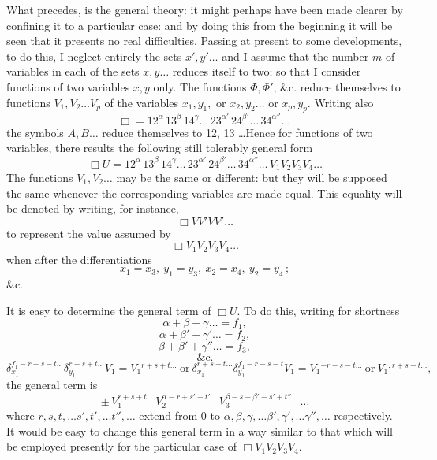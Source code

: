 \documentclass[11pt]{article}
\begin{document}
What precedes, is the general theory: it might perhaps have been made clearer
by confining it to a particular case: and by doing this from the beginning it will
be seen that it presents no real difficulties. Passing at present to some developments,
to do this, I neglect entirely the sets $x', y' \ldots$ and I assume that the number $m$ of
variables in each of the sets $x, y \ldots$ reduces itself to two; so that I consider functions
of two variables $x, y$ only. The functions $\Phi, \Phi'$, \&c. reduce themselves to functions
$V_1, V_2 \ldots V_p$ of the variables $x_1, y_1,$ or $x_2, y_2 \ldots$ or $x_p, y_p$. Writing also
\[
\Box = 12^\alpha\,13^\beta\,14^\gamma \ldots\,23^{\alpha'}\,24^{\beta'} \ldots\,34^{\alpha''} \ldots\,
\]
the symbols $A, B \ldots$ reduce themselves to 12, 13 \ldots Hence for functions of two
variables, there results the following still tolerably general form
\[
\Box U = 12^\alpha\,13^\beta\,14^\gamma \ldots\,23^{\alpha'}\,24^{\beta'} \ldots\,34^{\alpha''} \ldots\,V_1 V_2 V_3 V_4 \ldots
\]
The functions $V_1, V_2 \ldots$ may be the same or different: but they will be supposed the
same whenever the corresponding variables are made equal. This equality will be
denoted by writing, for instance,
\[
\Box V V' V V' \ldots
\]
to represent the value assumed by
\[
\Box V_1 V_2 V_3 V_4 \ldots
\]
when after the differentiations
\[
x_1 = x_3,\ y_1 = y_3,\ x_2 = x_4,\ y_2 = y_4 \,;
\]
\&c.

It is easy to determine the general term of $\Box U$. To do this, writing for shortness
\[
\alpha + \beta + \gamma \ldots = f_1,
\]
\[
\alpha + \beta' + \gamma' \ldots = f_2,
\]
\[
\beta + \beta' + \gamma'' \ldots = f_3,
\]
\[
\&\text{c.}
\]
\[
\delta_{x_1}^{f_1 - r - s - t \ldots} \delta_{y_1}^{r + s + t \ldots} V_1 = V_1{}^{r + s + t \ldots}\ \text{or}\ \delta_{x_1}^{r + s + t \ldots} \delta_{y_1}^{f_1 - r - s - t} V_1 = V_1{}^{-r - s - t \ldots}\ \text{or}\ V_1{}^{,r+s+t\ldots},
\]
the general term is
\[
\pm\,V_1^{r+s+t\ldots}\,V_2^{\alpha-r+s'+t'\ldots}\,V_3^{\beta-s+\beta'-s'+t''\ldots}\,\ldots
\]
where $r, s, t,\ldots s', t',\ldots t'',\ldots$ extend from 0 to $\alpha, \beta, \gamma,\ldots\beta', \gamma',\ldots\gamma'',\ldots$ respectively. It
would be easy to change this general term in a way similar to that which will be
employed presently for the particular case of $\Box V_1 V_2 V_3 V_4$.
\end{document}
